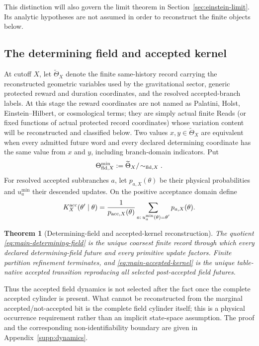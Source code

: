 \documentclass[11pt]{article}
\newtheorem{theorem}{Theorem}[section]
\numberwithin{equation}{section}
\theoremstyle{definition}
\theoremstyle{remark}
\begin{document}
This distinction will also govern the limit theorem in
Section~\ref{sec:einstein-limit}. Its analytic hypotheses are not
assumed in order to reconstruct the finite objects below.
\subsection{The determining field and accepted kernel}

At cutoff $X$, let $\widetilde\Theta_X$ denote the finite same-history record
carrying the reconstructed geometric variables used by the gravitational
sector, generic protected reward and duration coordinates, and the resolved
accepted-branch labels.  At this stage the reward coordinates are not named as
Palatini, Holst, Einstein--Hilbert, or cosmological terms; they are simply actual
finite Reads (or fixed functions of actual protected record coordinates) whose
variation content will be reconstructed and classified below.  Two values
$x,y\in\widetilde\Theta_X$ are equivalent
when every admitted future word and every declared determining coordinate has
the same value from $x$ and $y$, including branch-domain indicators.  Put
\begin{equation}
 \Theta_{{\rm fld},X}^{\min}
 :=\widetilde\Theta_X/\!\sim_{{\rm fld},X}.
 \label{eq:main-determining-field}
\end{equation}
For resolved accepted subbranches $a$, let $p_{a,X}(\theta)$ be their physical
probabilities and $u_a^{\min}$ their descended updates.  On the positive
acceptance domain define
\begin{equation}
 K_X^{\rm acc}(\theta'\mid\theta)
 =\frac{1}{p_{{\rm acc},X}(\theta)}
   \sum_{\substack{a:\,u_a^{\min}(\theta)=\theta'}}p_{a,X}(\theta).
 \label{eq:main-accepted-kernel}
\end{equation}

\begin{theorem}[Determining-field and accepted-kernel reconstruction]
\label{thm:main-determining-kernel}
The quotient \eqref{eq:main-determining-field} is the unique coarsest finite
record through which every declared determining-field future and every
primitive update factors.  Finite partition refinement terminates, and
\eqref{eq:main-accepted-kernel} is the unique table-native accepted transition
reproducing all selected post-accepted field futures.
\end{theorem}

Thus the accepted field dynamics is not selected after the fact once the
complete accepted cylinder is present.  What cannot be reconstructed from the
marginal accepted/not-accepted bit is the complete field cylinder itself; this
is a physical occurrence requirement rather than an implicit state-space
assumption.  The proof and the corresponding non-identifiability boundary are
given in Appendix~\ref{supp:dynamics}.
\end{document}
